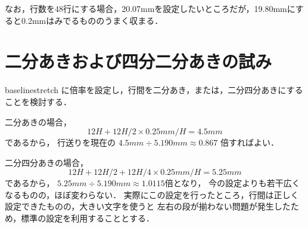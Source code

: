 \documentclass[a4j, 12Q, twocolumn, twoside]{jsarticle}
\begin{document}
  なお，行数を48行にする場合，20.07mmを設定したいところだが，19.80mmにすると0.2mmはみでるもののうまく収まる．
  
\section{二分あきおよび四分二分あきの試み}
  baselinestretch に倍率を設定し，行間を二分あき，または，二分四分あきにすることを検討する．
  
  二分あきの場合，
  \[ 12H + 12H/2 \times 0.25mm/H= 4.5mm\]であるから，
  行送りを現在の
  $4.5mm \div 5.190mm \approx 0.867$
  倍すればよい．

  二分四分あきの場合，
  \[ 12H + 12H/2 + 12H/4 \times 0.25mm/H= 5.25mm\]であるから，
  $5.25mm \div 5.190mm \approx 1.0115$倍となり， 
  今の設定よりも若干広くなるものの，ほぼ変わらない．
  実際にこの設定を行ったところ，行間は正しく設定できたものの，大きい文字を使うと
  左右の段が揃わない問題が発生したため，標準の設定を利用することとする．
\end{document}
